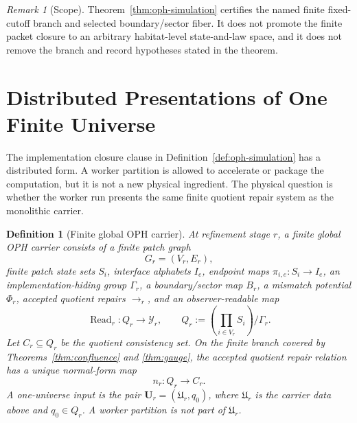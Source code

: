 \documentclass[11pt]{article}
\newtheorem{definition}[theorem]{Definition}
\theoremstyle{remark}
\newtheorem{remark}[theorem]{Remark}
\theoremstyle{plain}
\begin{document}
\begin{remark}[Scope]\label{rem:oph-simulation-scope}
Theorem~\ref{thm:oph-simulation} certifies the named finite fixed-cutoff branch and selected
boundary/sector fiber. It does not promote the finite packet closure to an arbitrary habitat-level
state-and-law space, and it does not remove the branch and record hypotheses stated in the
theorem.
\end{remark}

\section{Distributed Presentations of One Finite Universe}
\label{sec:distributed-one-universe}

The implementation closure clause in Definition~\ref{def:oph-simulation} has a distributed
form. A worker partition is allowed to accelerate or package the computation, but it is not a
new physical ingredient. The physical question is whether the worker run presents the same
finite quotient repair system as the monolithic carrier.

\begin{definition}[Finite global OPH carrier]\label{def:finite-global-carrier}
At refinement stage \(r\), a finite global OPH carrier consists of a finite patch graph
\[
G_r=(V_r,E_r),
\]
finite patch state sets \(S_i\), interface alphabets \(I_e\), endpoint maps
\(\pi_{i,e}:S_i\to I_e\), an implementation-hiding group \(\Gamma_r\), a boundary/sector map
\(B_r\), a mismatch potential \(\Phi_r\), accepted quotient repairs \(\to_r\), and an
observer-readable map
\[
\operatorname{Read}_r:Q_r\to\mathcal Y_r,
\qquad
Q_r:=\left(\prod_{i\in V_r}S_i\right)/\Gamma_r.
\]
Let \(C_r\subseteq Q_r\) be the quotient consistency set. On the finite branch covered by
Theorems~\ref{thm:confluence} and \ref{thm:gauge}, the accepted quotient repair relation has a
unique normal-form map
\[
n_r:Q_r\to C_r.
\]
A one-universe input is the pair \(\mathbf U_r=(\mathfrak U_r,q_0)\), where
\(\mathfrak U_r\) is the carrier data above and \(q_0\in Q_r\). A worker partition is not part
of \(\mathfrak U_r\).
\end{definition}
\end{document}

